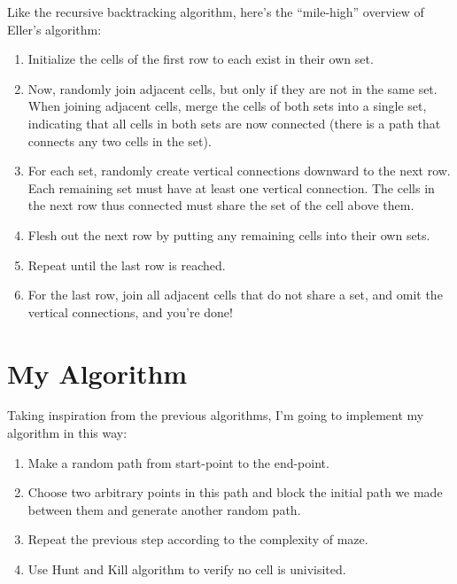 \documentclass{article}
\begin{document}
Like the recursive backtracking algorithm, here's the “mile-high” overview of Eller's algorithm:
\begin{enumerate}
    \item Initialize the cells of the first row to each exist in their own set.
    \item Now, randomly join adjacent cells, but only if they are not in the same set. When joining adjacent cells, merge the cells of both sets into a single set, indicating that all cells in both sets are now connected (there is a path that connects any two cells in the set).
    \item For each set, randomly create vertical connections downward to the next row. Each remaining set must have at least one vertical connection. The cells in the next row thus connected must share the set of the cell above them.
    \item Flesh out the next row by putting any remaining cells into their own sets.
    \item Repeat until the last row is reached.
    \item For the last row, join all adjacent cells that do not share a set, and omit the vertical connections, and you're done!
\end{enumerate}

\section*{My Algorithm}
Taking inspiration from the previous algorithms, I'm going to implement my algorithm in this way:

\begin{enumerate}
    \item Make a random path from start-point to the end-point.
    \item Choose two arbitrary points in this path and block the initial path we made between them and generate another random path.
    \item Repeat the previous step according to the complexity of maze.
    \item Use Hunt and Kill algorithm to verify no cell is univisited.
\end{enumerate}

\printbibliography
\end{document}
